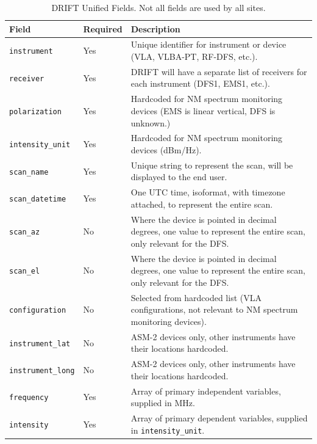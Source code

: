 \documentclass[titlepage]{article}
\begin{document}
\begin{table}
  \begin{center}
    \begin{tabularx}{\linewidth}{l|l|X}
      Field       & Required  & Description \\ \hline
      \lstinline|instrument|    & Yes & Unique identifier for instrument or device (VLA, VLBA-PT, RF-DFS, etc.).\\
      \lstinline|receiver|      & Yes & DRIFT will have a separate list of receivers for each instrument (DFS1, EMS1, etc.). \\
      \lstinline|polarization|  & Yes & Hardcoded for NM spectrum monitoring devices (EMS is linear vertical, DFS is unknown.)\\
      \lstinline|intensity_unit|& Yes & Hardcoded for NM spectrum monitoring devices (dBm/Hz). \\
      \lstinline|scan_name|     & Yes & Unique string to represent the scan, will be displayed to the end user.\\
      \lstinline|scan_datetime| & Yes & One UTC time, isoformat, with timezone attached, to represent the entire scan.\\
      \lstinline|scan_az|       & No  & Where the device is pointed in decimal degrees, one value to represent the entire scan, only relevant for the DFS.\\
      \lstinline|scan_el|       & No  & Where the device is pointed in decimal degrees, one value to represent the entire scan, only relevant for the DFS.\\
      \lstinline|configuration| & No  & Selected from hardcoded list (VLA configurations, not relevant to NM spectrum monitoring devices).\\
      \lstinline|instrument_lat|& No  & ASM-2 devices only, other instruments have their locations hardcoded.\\
      \lstinline|instrument_long|&No  & ASM-2 devices only, other instruments have their locations hardcoded.\\
      \lstinline|frequency|     & Yes & Array of primary independent variables, supplied in MHz.\\
      \lstinline|intensity|     & Yes & Array of primary dependent variables, supplied in \lstinline|intensity_unit|.\\
    \end{tabularx}
  \end{center}
  \caption{DRIFT Unified Fields. Not all fields are used by all sites.}\label{tab:driftdata}
\end{table}
\end{document}
